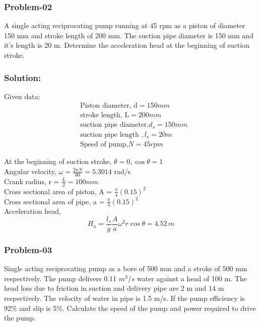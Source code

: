 \documentclass{article}
\begin{document}
\begin{multicols}{2}
      \subsubsection*{Problem-02}
      A single acting reciprocating pump running at 45 rpm as a piston of diameter 150 mm and stroke length of 200 mm. The suction pipe diameter is 150 mm and it's length is 20 m. Determine the acceleration head at the beginning of suction stroke. 
      \subsubsection*{Solution:}
      Given data:
      \begin{align*}
        &\text{Piston diameter, d} = 150 mm \\
        &\text{stroke length, L} = 200 mm \\
        &\text{suction pipe diameter,} d_s = 150 mm \\
        &\text{suction pipe length }, l_s = 20 m \\
        &\text{Speed of pump,} N = 45 rpm 
      \end{align*}
      
      At the beginning of suction stroke, $\theta = 0,  \cos \theta = 1$ \\
      Angular velocity, $\omega = \frac{2\pi N}{60} = 5.3014$ rad/s \\
      Crank radius, r = $\frac{L}{2} = 100 mm$ \\
      Cross sectional area of piston, A = $\frac{\pi}{4} (0.15)^2$ \\ 
      Cross sectional area of pipe, a = $\frac{\pi}{4} (0.15)^2$\\
      Acceleration head, $$H_a = \frac{l_s}{g} \frac{A}{a} \omega^2 r \cos \theta = 4.52 \, m $$

      \subsubsection*{Problem-03}
      Single acting reciprocating pump as a bore of 500 mm and a stroke of 500 mm respectively. The pump delivers 0.11 $m^3/s$ water against a head of 100 m. The head loss due to friction in suction and delivery pipe are 2 m  and 14 m respectively. The velocity of water in pipe is 1.5 m/s. If the pump efficiency is 92\% and slip is 5\%. Calculate the speed of the pump and power required to drive the pump. 


\end{multicols}
\end{document}
